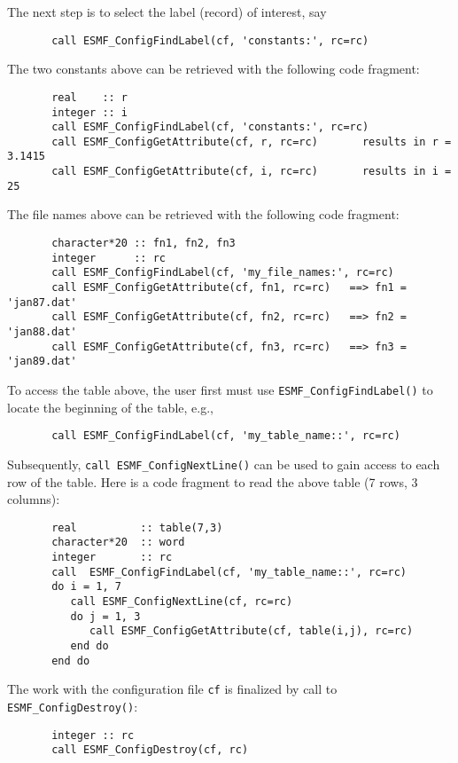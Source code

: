     The next step is to select the label (record) of interest, say

 \begin{verbatim}
       call ESMF_ConfigFindLabel(cf, 'constants:', rc=rc)
 \end{verbatim}

  The two constants above can be retrieved with the following code
  fragment:
 \begin{verbatim}
       real    :: r
       integer :: i
       call ESMF_ConfigFindLabel(cf, 'constants:', rc=rc)
       call ESMF_ConfigGetAttribute(cf, r, rc=rc)       results in r = 3.1415
       call ESMF_ConfigGetAttribute(cf, i, rc=rc)       results in i = 25
 \end{verbatim}

  The file names above can be retrieved with the following
  code fragment:
 \begin{verbatim}
       character*20 :: fn1, fn2, fn3
       integer      :: rc
       call ESMF_ConfigFindLabel(cf, 'my_file_names:', rc=rc)
       call ESMF_ConfigGetAttribute(cf, fn1, rc=rc)   ==> fn1 = 'jan87.dat'
       call ESMF_ConfigGetAttribute(cf, fn2, rc=rc)   ==> fn2 = 'jan88.dat'
       call ESMF_ConfigGetAttribute(cf, fn3, rc=rc)   ==> fn3 = 'jan89.dat'
 \end{verbatim}

 To access the table above, the user first must use 
 {\tt ESMF\_ConfigFindLabel()} to locate the beginning of the table, e.g.,

 \begin{verbatim}
       call ESMF_ConfigFindLabel(cf, 'my_table_name::', rc=rc)
 \end{verbatim}

 Subsequently, {\tt call ESMF\_ConfigNextLine()} can be used to gain 
 access to each row of the table. Here is a code fragment to read the above
 table (7 rows, 3 columns):

 \begin{verbatim}
       real          :: table(7,3)
       character*20  :: word
       integer       :: rc
       call  ESMF_ConfigFindLabel(cf, 'my_table_name::', rc=rc)
       do i = 1, 7
          call ESMF_ConfigNextLine(cf, rc=rc)
          do j = 1, 3
             call ESMF_ConfigGetAttribute(cf, table(i,j), rc=rc)
          end do                   
       end do
 \end{verbatim}

 The work with the configuration file {\tt cf} is finalized by call to
 {\tt ESMF\_ConfigDestroy()}:
 \begin{verbatim}
       integer :: rc
       call ESMF_ConfigDestroy(cf, rc)
 \end{verbatim}

